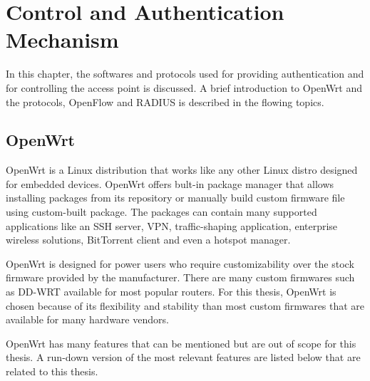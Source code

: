 
\chapter{Control and Authentication Mechanism}\label{ch:control_and_authentication}
\sffamily{}

In this chapter, the softwares and protocols used for providing authentication and for controlling the access point is discussed. A brief introduction to OpenWrt and the protocols, OpenFlow and RADIUS is described in the flowing topics.
\section{OpenWrt \cite{WhatIsOpenWrt}} \label{OpenWrt}

OpenWrt is a Linux distribution that works like any other Linux distro designed for embedded devices. OpenWrt offers bult-in package manager that allows installing packages from its repository or manually build custom firmware file using custom-built package. The packages can contain many supported applications like an SSH server, VPN, traffic-shaping application, enterprise wireless solutions, BitTorrent client and even a hotspot manager.

OpenWrt is designed for power users who require customizability over the stock firmware provided by the manufacturer. There are many custom firmwares such as DD-WRT available for most popular routers. For this thesis, OpenWrt is chosen because of its flexibility and stability than most custom firmwares that are available for many hardware vendors.

OpenWrt has many features that can be mentioned but are out of scope for this thesis. A run-down version of the most relevant features are listed below that are related to this thesis.

